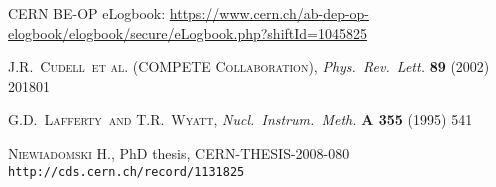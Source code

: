 \documentclass[3p,twocolumn]{elsarticle}
\def\etal{et al.}
\def\Name#1{\textsc{#1}, }
\def\REVIEW#1#2#3#4{{\it #1} {\bf #2} (#3) #4}
\begin{document}
\begin{thebibliography}{99}
 CERN BE-OP eLogbook: \url{https://www.cern.ch/ab-dep-op-elogbook/elogbook/secure/eLogbook.php?shiftId=1045825}

	\Name{J.R.~Cudell~\etal{} (COMPETE Collaboration)}
	\REVIEW{Phys.\ Rev.\ Lett.}{89}{2002}{201801}

	\Name{G.D.~Lafferty~and T.R.~Wyatt}
	\REVIEW{Nucl.\ Instrum.\ Meth.}{A 355}{1995}{541}

	\Name{Niewiadomski H.}
    PhD thesis, 
    CERN-THESIS-2008-080 
	{\tt http://cds.cern.ch/record/1131825}

\iffalse

\bibitem{1km}
	\Name{G.~Antchev~\etal{}~(TOTEM Collaboration)}
        Measurement of Elastic pp Scattering at $\sqrt{s}=8\,$TeV in the 
        Coulomb-Nuclear Interference Region by the TOTEM Experiment at the 
        CERN LHC, this journal.

\bibitem{epl95}
	\Name{Antchev G.~\etal{}~(TOTEM Collaboration)}
	\REVIEW{Europhys.~Lett.}{95}{2011}{41001}


\bibitem{epl101-inel}
	\Name{Antchev G.~\etal{}~(TOTEM Collaboration)}
	\REVIEW{Europhys.~Lett.}{101}{2013}{21003}

\bibitem{epl101-tot}
	\Name{Antchev G.~\etal{}~(TOTEM Collaboration)}
	\REVIEW{Europhys.~Lett.}{101}{2013}{21004}

\bibitem{jan_thesis}
	\Name{Ka\v spar J.}
	PhD Thesis, CERN-THESIS-2011-214, {\tt http://cdsweb.cern.ch/record/1441140}

\bibitem{mario_ipac_2011}
	\Name{Deile M.}
	{\it The First 1 1/2 Years of TOTEM Roman Pot Operation at LHC}, in
	{\it Proceedings of the 2nd International Particle Accelerator Conference (IPAC 2011), San Sebastian, Spain}. 
	arXiv:1110.5808v1



\fi

\end{thebibliography}
\end{document}
